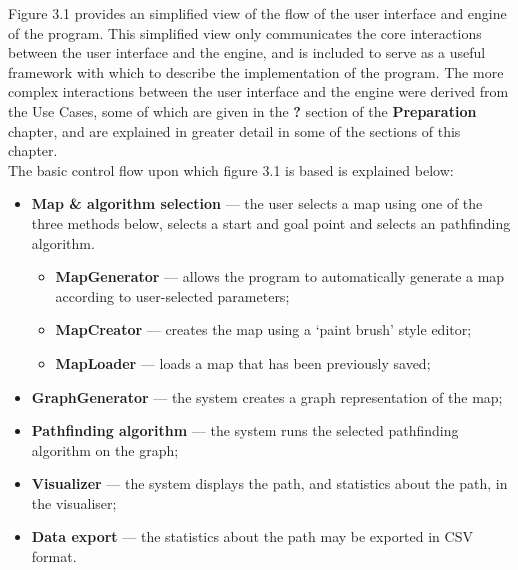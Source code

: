 \documentclass[12pt,notitlepage]{report}
\begin{document}
\noindent
Figure 3.1 provides an simplified view of the flow of the user interface and engine of the program. This simplified view only communicates the core interactions between the user interface and the engine, and is included to serve as a useful framework with which to describe the implementation of the program. The more complex interactions between the user interface and the engine were derived from the Use Cases, some of which are given in the {\bfseries ?} section of the {\bfseries Preparation} chapter, and are explained in greater detail in some of the sections of this chapter.\\

\noindent
The basic control flow upon which figure 3.1 is based is explained below:
\begin{itemize}
\item {\bfseries Map \& algorithm selection} --- the user selects a map using one of the three methods below, selects a start and goal point and selects an pathfinding algorithm.
  \begin{itemize}
  \item {\bfseries MapGenerator} --- allows the program to automatically generate a map according to user-selected parameters;
  \item {\bfseries MapCreator} --- creates the map using a `paint brush' style editor;
  \item {\bfseries MapLoader} --- loads a map that has been previously saved;
  \end{itemize}
\item {\bfseries GraphGenerator} --- the system creates a graph representation of the map;
\item {\bfseries Pathfinding algorithm} --- the system runs the selected pathfinding algorithm on the graph;
\item {\bfseries Visualizer} --- the system displays the path, and statistics about the path, in the visualiser;
\item {\bfseries Data export} --- the statistics about the path may be exported in CSV format.
\end{itemize}
\end{document}
